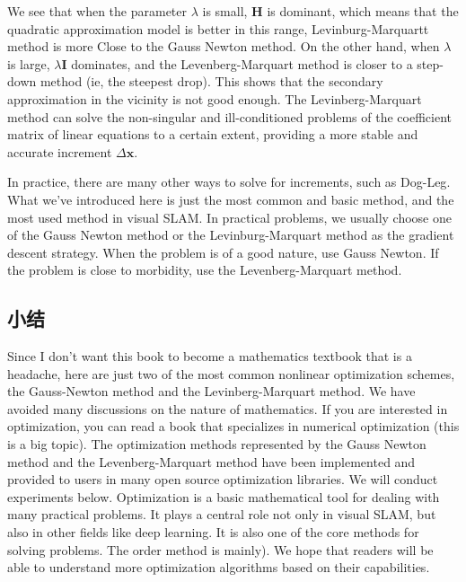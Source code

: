 We see that when the parameter $\lambda$ is small, $\bm{H}$ is dominant, which means that the quadratic approximation model is better in this range, Levinburg-Marquartt method is more Close to the Gauss Newton method. On the other hand, when $\lambda$ is large, $\lambda \bm{I}$ dominates, and the Levenberg-Marquart method is closer to a step-down method (ie, the steepest drop). This shows that the secondary approximation in the vicinity is not good enough. The Levinberg-Marquart method can solve the non-singular and ill-conditioned problems of the coefficient matrix of linear equations to a certain extent, providing a more stable and accurate increment $\Delta \bm{x} $.

In practice, there are many other ways to solve for increments, such as Dog-Leg\cite{Nocedal2006}. What we've introduced here is just the most common and basic method, and the most used method in visual SLAM. In practical problems, we usually choose one of the Gauss Newton method or the Levinburg-Marquart method as the gradient descent strategy. When the problem is of a good nature, use Gauss Newton. If the problem is close to morbidity, use the Levenberg-Marquart method.

\subsection{小结}
Since I don't want this book to become a mathematics textbook that is a headache, here are just two of the most common nonlinear optimization schemes, the Gauss-Newton method and the Levinberg-Marquart method. We have avoided many discussions on the nature of mathematics. If you are interested in optimization, you can read a book that specializes in numerical optimization (this is a big topic)\cite{Nocedal2006}. The optimization methods represented by the Gauss Newton method and the Levenberg-Marquart method have been implemented and provided to users in many open source optimization libraries. We will conduct experiments below. Optimization is a basic mathematical tool for dealing with many practical problems. It plays a central role not only in visual SLAM, but also in other fields like deep learning. It is also one of the core methods for solving problems. The order method is mainly). We hope that readers will be able to understand more optimization algorithms based on their capabilities.

